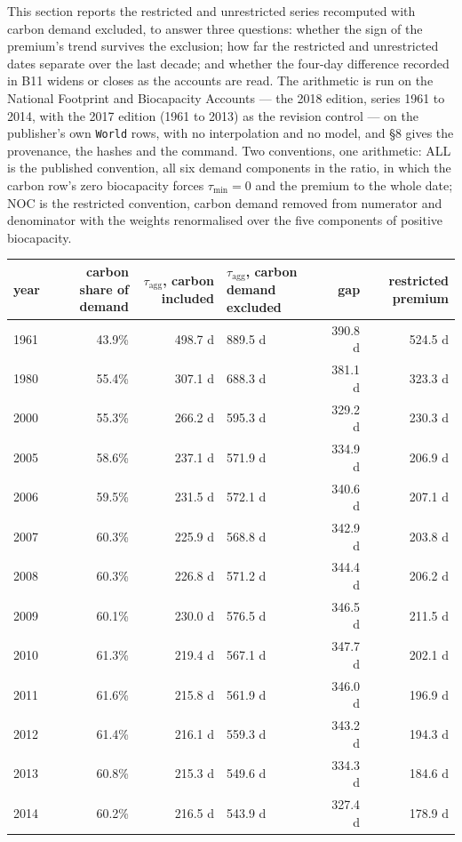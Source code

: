 \documentclass[11pt]{article}
\begin{document}
This section reports the restricted and unrestricted series recomputed with carbon demand excluded, to answer three questions: whether the sign of the premium's trend survives the exclusion; how far the restricted and unrestricted dates separate over the last decade; and whether the four-day difference recorded in B11 widens or closes as the accounts are read. The arithmetic is run on the National Footprint and Biocapacity Accounts --- the 2018 edition, series 1961 to 2014, with the 2017 edition (1961 to 2013) as the revision control --- on the publisher's own \texttt{World} rows, with no interpolation and no model, and \S8 gives the provenance, the hashes and the command. Two conventions, one arithmetic: ALL is the published convention, all six demand components in the ratio, in which the carbon row's zero biocapacity forces \(\tau_{\min} = 0\) and the premium to the whole date; NOC is the restricted convention, carbon demand removed from numerator and denominator with the weights renormalised over the five components of positive biocapacity.

\begin{longtable}{@{}l|r|r|p{31mm}|r|r@{}}
\toprule
year & carbon share of demand & \(\tau_{\mathrm{agg}}\), carbon included & \(\tau_{\mathrm{agg}}\), carbon demand excluded & gap & restricted premium \\
\midrule
1961 & 43.9\% & 498.7 d & 889.5 d & 390.8 d & 524.5 d \\
1980 & 55.4\% & 307.1 d & 688.3 d & 381.1 d & 323.3 d \\
2000 & 55.3\% & 266.2 d & 595.3 d & 329.2 d & 230.3 d \\
2005 & 58.6\% & 237.1 d & 571.9 d & 334.9 d & 206.9 d \\
2006 & 59.5\% & 231.5 d & 572.1 d & 340.6 d & 207.1 d \\
2007 & 60.3\% & 225.9 d & 568.8 d & 342.9 d & 203.8 d \\
2008 & 60.3\% & 226.8 d & 571.2 d & 344.4 d & 206.2 d \\
2009 & 60.1\% & 230.0 d & 576.5 d & 346.5 d & 211.5 d \\
2010 & 61.3\% & 219.4 d & 567.1 d & 347.7 d & 202.1 d \\
2011 & 61.6\% & 215.8 d & 561.9 d & 346.0 d & 196.9 d \\
2012 & 61.4\% & 216.1 d & 559.3 d & 343.2 d & 194.3 d \\
2013 & 60.8\% & 215.3 d & 549.6 d & 334.3 d & 184.6 d \\
2014 & 60.2\% & 216.5 d & 543.9 d & 327.4 d & 178.9 d \\
\bottomrule
\end{longtable}
\end{document}
